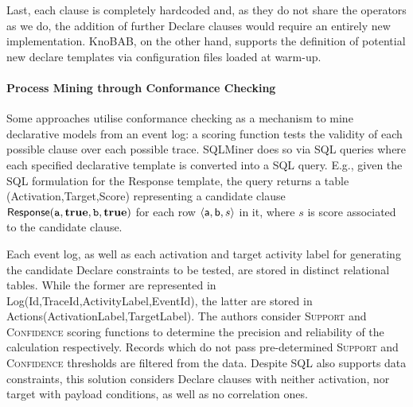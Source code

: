 Last, each clause is completely hardcoded and, as they do not share the operators as we do, the addition of further Declare clauses would require an entirely new implementation. KnoBAB, on the other hand, supports the definition of potential new declare templates via configuration files loaded at warm-up. %




\paragraph*{Process Mining through Conformance Checking}
Some approaches utilise conformance checking as a mechanism to mine declarative {models}  from an event log: a scoring function tests %
the validity of each possible clause over each possible trace. %
SQLMiner \cite{SchonigRCJM16} {does so via} SQL queries \cite{Schonig15} {where e}ach specified declarative {template} %
{is} converted into a SQL query. E.g., given the SQL formulation for the \textsf{Response} template, the query returns a table \textsf{(Activation,Target,Score)} representing a candidate clause $\textsf{Response}(\texttt{a},\textbf{true},\texttt{b},\textbf{true})$ for each row $\braket{\textsf{a},\textsf{b},s}$ in it, where $s$ is   score associated to the candidate clause.

Each event log, as well as each activation and target activity label for generating the candidate Declare constraints to be tested, are stored in distinct relational tables. While the former are represented in  \textsf{Log(Id,TraceId,ActivityLabel,EventId)}, the latter are stored in \textsf{Actions(ActivationLabel,TargetLabel)}. The authors consider 
\textsc{Support} and \textsc{Confidence} scoring functions to determine the precision and reliability of the calculation respectively. Records which do not pass pre-determined \textsc{Support} and \textsc{Confidence} thresholds are filtered from the data. {Despite } SQL also supports data constraints, this solution considers Declare clauses with neither activation, nor target %
with payload conditions, as well as no correlation ones.

